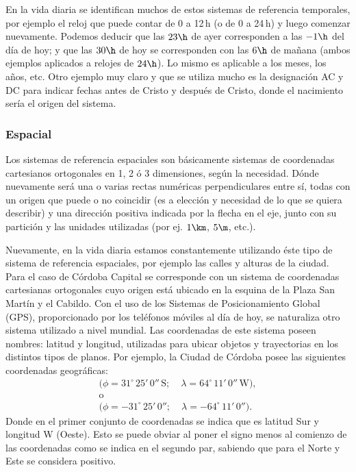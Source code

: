 En la vida diaria se identifican muchos de estos sistemas de referencia
temporales, por ejemplo el reloj que puede contar de 0 a 12\,h (o de 0 a 24\,h)
y luego comenzar nuevamente. Podemos deducir que las $23\h$ de ayer corresponden
a las $-1\h$ del día de hoy; y que las $30\h$ de hoy se corresponden con las
$6\h$ de mañana (ambos ejemplos aplicados a relojes de $24\h$). Lo mismo es
aplicable a los meses, los años, etc. Otro ejemplo muy claro y que se
utiliza mucho es la designación AC y DC para indicar fechas antes de Cristo y
después de Cristo, donde el nacimiento sería el origen del sistema.

\subsubsection{Espacial}
\label{c.sre}

Los sistemas de referencia espaciales son básicamente sistemas de coordenadas
cartesianos ortogonales en 1, 2 ó 3 dimensiones, según la necesidad. Dónde
nuevamente será una o varias rectas numéricas perpendiculares entre sí, todas
con un origen que puede o no coincidir (es a elección y necesidad de lo que se
quiera describir) y una dirección positiva indicada por la flecha en el eje,
junto con su partición y las unidades utilizadas (por ej. $1\km$, $5\m$, etc.).

Nuevamente, en la vida diaria estamos constantemente utilizando éste tipo de
sistema de referencia espaciales, por ejemplo las calles y alturas de la ciudad.
Para el caso de Córdoba Capital se corresponde con un sistema de coordenadas
cartesianas ortogonales cuyo origen está ubicado en la esquina de la Plaza San
Martín y el Cabildo. Con el uso de los Sistemas de Posicionamiento Global (GPS),
proporcionado por los teléfonos móviles al día de hoy, se naturaliza otro
sistema utilizado a nivel mundial. Las coordenadas de este sistema poseen
nombres: latitud y longitud, utilizadas para ubicar objetos y trayectorias
en los distintos tipos de planos. Por ejemplo, la Ciudad de Córdoba posee las
siguientes coordenadas geográficas: 
\begin{align*}
  (\phi = 31^{\circ}\, 25'\, 0''\, \mathrm{S}; &
  \: \lambda = 64^{\circ}\, 11'\, 0''\, \mathrm{W}), \\
  \mathrm{o} \\
  (\phi = -31^{\circ}\, 25'\, 0'';&
  \; \lambda = - 64^{\circ}\, 11'\, 0'').
\end{align*}
Donde en el primer conjunto de coordenadas se indica que es latitud Sur y
longitud W (Oeste). Esto se puede obviar al poner el signo menos al comienzo de
las coordenadas como se indica en el segundo par, sabiendo que para el Norte y
Este se considera positivo.


